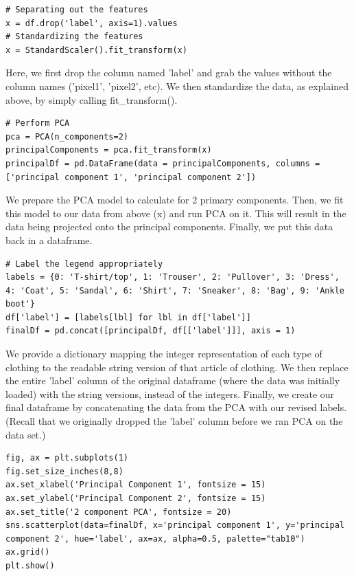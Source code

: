 \documentclass{article}
\begin{document}
\begin{lstlisting}
# Separating out the features
x = df.drop('label', axis=1).values
# Standardizing the features
x = StandardScaler().fit_transform(x)
\end{lstlisting}

\noindent Here, we first drop the column named 'label' and grab the values without the column names ('pixel1', 'pixel2', etc). We then standardize the data, as explained above, by simply calling fit\_transform().

\begin{lstlisting}
# Perform PCA
pca = PCA(n_components=2)
principalComponents = pca.fit_transform(x)
principalDf = pd.DataFrame(data = principalComponents, columns = ['principal component 1', 'principal component 2'])
\end{lstlisting}

\noindent We prepare the PCA model to calculate for 2 primary components. Then, we fit this model to our data from above (x) and run PCA on it. This will result in the data being projected onto the principal components. Finally, we put this data back in a dataframe.

\begin{lstlisting}
# Label the legend appropriately
labels = {0: 'T-shirt/top', 1: 'Trouser', 2: 'Pullover', 3: 'Dress', 4: 'Coat', 5: 'Sandal', 6: 'Shirt', 7: 'Sneaker', 8: 'Bag', 9: 'Ankle boot'}
df['label'] = [labels[lbl] for lbl in df['label']]
finalDf = pd.concat([principalDf, df[['label']]], axis = 1)
\end{lstlisting}

\noindent We provide a dictionary mapping the integer representation of each type of clothing to the readable string version of that article of clothing. We then replace the entire 'label' column of the original dataframe (where the data was initially loaded) with the string versions, instead of the integers. Finally, we create our final dataframe by concatenating the data from the PCA with our revised labels. (Recall that we originally dropped the 'label' column before we ran PCA on the data set.)

\begin{lstlisting}
fig, ax = plt.subplots(1)
fig.set_size_inches(8,8)
ax.set_xlabel('Principal Component 1', fontsize = 15)
ax.set_ylabel('Principal Component 2', fontsize = 15)
ax.set_title('2 component PCA', fontsize = 20)
sns.scatterplot(data=finalDf, x='principal component 1', y='principal component 2', hue='label', ax=ax, alpha=0.5, palette="tab10")
ax.grid()
plt.show()
\end{lstlisting}
\end{document}
